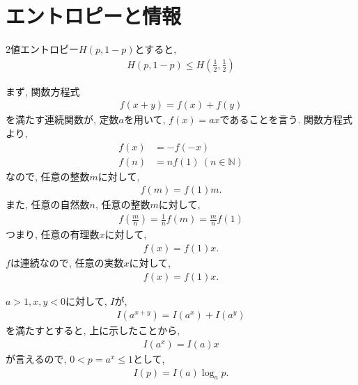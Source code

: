 \chapter{エントロピーと情報}

\begin{ex}
    \label{ex11.1}
    2値エントロピー$H(p,1-p)$とすると,
    \begin{align*}
        H\left(p,1-p\right) \leq H\left(\frac{1}{2}, \frac{1}{2}\right)
    \end{align*}
\end{ex}

\begin{ex}
    \label{ex11.2}
    まず, 関数方程式
    \begin{align*}
        f(x+y) = f(x) + f(y)
    \end{align*}
    を満たす連続関数が, 定数$a$を用いて, $f(x) = ax$であることを言う. 関数方程式より,
    \begin{align*}
        f(x) & = - f(-x)                     \\
        f(n) & = nf(1) \  (n \in \mathbb{N})
    \end{align*}
    なので, 任意の整数$m$に対して,
    \begin{align*}
        f(m) = f(1) m.
    \end{align*}
    また, 任意の自然数$n$, 任意の整数$m$に対して,
    \begin{align*}
        f\left( \frac{m}{n}\right) =  \frac{1}{n} f(m) = \frac{m}{n} f(1)
    \end{align*}
    つまり, 任意の有理数$x$に対して,
    \begin{align*}
        f(x) = f(1)x.
    \end{align*}
    $f$は連続なので, 任意の実数$x$に対して,
    \begin{align*}
        f(x) = f(1) x.
    \end{align*}
    \par
    $a >1, x,y < 0$に対して, $I$が,
    \begin{align*}
        I ( a^{x+y}) = I(a^x) + I(a^y)
    \end{align*}
    を満たすとすると, 上に示したことから,
    \begin{align*}
        I(a^x) = I(a) x
    \end{align*}
    が言えるので, $0 < p = a^x \leq 1$として,
    \begin{align*}
        I(p) = I(a) \log_a p.
    \end{align*}
\end{ex}

